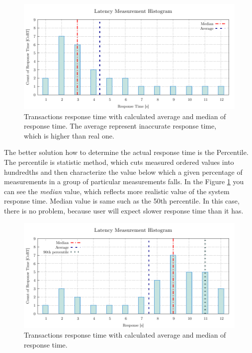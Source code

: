 \begin{figure}[H]
  \centering
  \includegraphics[width=15cm]{obrazky-figures/average_median_1.pdf}
  \caption{Transactions response time with calculated average and median of response time. The average represent inaccurate response time, which is higher than real one.}
  \label{fig:average_percentil_1}
\end{figure}

The better solution how to determine the actual response time is the Percentile. The percentile is statistic method, which cuts measured ordered values into hundredths and then characterize the value below which a given percentage of measurements in a group of particular measurements falls. In the Figure \ref{fig:average_percentil_1} you can see the \emph{median} value, which reflects more realistic value of the system response time. Median value is same such as the 50th percentile. In this case, there is no problem, because user will expect slower response time than it has.

\begin{figure}[H]
  \centering
  \includegraphics[width=15cm]{obrazky-figures/average_median_2.pdf}
  \caption{Transactions response time with calculated average and median of response time.}
  \label{fig:average_percentil_2}
\end{figure}

